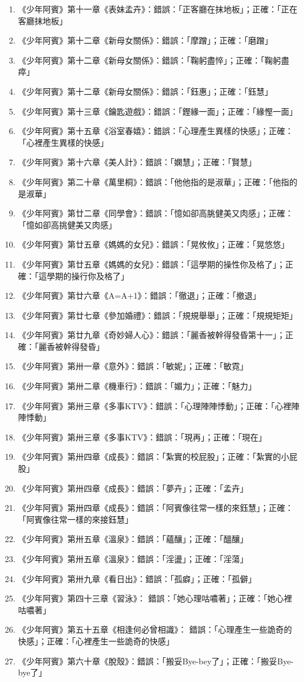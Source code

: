 \begin{enumerate}
\item 《少年阿賓》第十一章《表妹孟卉》：錯誤：「正客廳在抹地板」；正確：「正在客廳抹地板」
\item 《少年阿賓》第十二章《新母女關係》：錯誤：「摩蹭」；正確：「磨蹭」
\item 《少年阿賓》第十二章《新母女關係》：錯誤：「鞠躬盡悴」；正確：「鞠躬盡瘁」
\item 《少年阿賓》第十二章《新母女關係》：錯誤：「鈺惠」；正確：「鈺慧」
\item 《少年阿賓》第十三章《鑰匙遊戲》：錯誤：「鏗緣一面」；正確：「緣慳一面」
\item 《少年阿賓》第十五章《浴室春嬉》：錯誤：「心理產生異樣的快感」；正確：「心裡產生異樣的快感」
\item 《少年阿賓》第十六章《美人計》：錯誤：「嫻慧」；正確：「賢慧」
\item 《少年阿賓》第二十章《萬里桐》：錯誤：「他他指的是淑華」；正確：「他指的是淑華」
\item 《少年阿賓》第廿二章《同學會》：錯誤：「憶如卻高朓健美又肉感」；正確：「憶如卻高挑健美又肉感」
\item 《少年阿賓》第廿五章《媽媽的女兒》：錯誤：「晃攸攸」；正確：「晃悠悠」
\item 《少年阿賓》第廿五章《媽媽的女兒》：錯誤：「這學期的操性你及格了」；正確：「這學期的操行你及格了」
\item 《少年阿賓》第廿六章《A=A+1》：錯誤：「徹退」；正確：「撤退」
\item 《少年阿賓》第廿七章《參加婚禮》：錯誤：「規規舉舉」；正確：「規規矩矩」
\item 《少年阿賓》第廿九章《奇妙婦人心》：錯誤：「麗香被幹得發昏第十一」；正確：「麗香被幹得發昏」
\item 《少年阿賓》第卅一章《意外》：錯誤：「敏妮」；正確：「敏霓」
\item 《少年阿賓》第卅二章《機車行》：錯誤：「媚力」；正確：「魅力」
\item 《少年阿賓》第卅三章《多事KTV》：錯誤：「心理陣陣悸動」；正確：「心裡陣陣悸動」
\item 《少年阿賓》第卅三章《多事KTV》：錯誤：「現再」；正確：「現在」
\item 《少年阿賓》第卅四章《成長》：錯誤：「紮實的校屁股」；正確：「紮實的小屁股」
\item 《少年阿賓》第卅四章《成長》：錯誤：「夢卉」；正確：「孟卉」
\item 《少年阿賓》第卅四章《成長》：錯誤：「阿賓像往常一樣的來鈺慧」；正確：「阿賓像往常一樣的來接鈺慧」
\item 《少年阿賓》第卅五章《溫泉》：錯誤：「蘊釀」；正確：「醞釀」
\item 《少年阿賓》第卅五章《溫泉》：錯誤：「淫盪」；正確：「淫蕩」
\item 《少年阿賓》第卅九章《看日出》：錯誤：「孤癖」；正確：「孤僻」
\item 《少年阿賓》第四十三章《習泳》： 錯誤：「她心理咕噥著」；正確：「她心裡咕噥著」
\item 《少年阿賓》第五十五章《相逢何必曾相識》： 錯誤：「心理產生一些詭奇的快感」；正確：「心裡產生一些詭奇的快感」
\item 《少年阿賓》第六十章《脫殼》：錯誤：「搬妥Bye-bey了」；正確：「搬妥Bye-bye了」
\end{enumerate}

